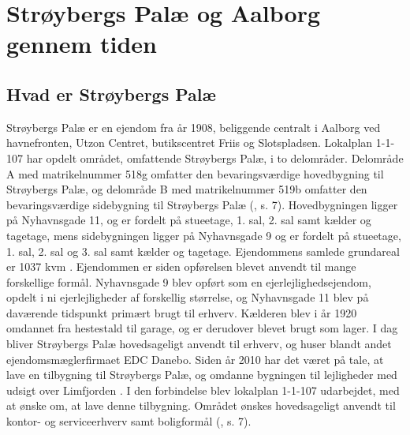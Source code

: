 \chapter{Strøybergs Palæ og Aalborg gennem tiden}

\section{Hvad er Strøybergs Palæ}
Strøybergs Palæ er en ejendom fra år 1908, beliggende centralt i Aalborg ved havnefronten, Utzon Centret, butikscentret Friis og Slotspladsen.
\newline \indent{     }  Lokalplan 1-1-107 har opdelt området, omfattende Strøybergs Palæ, i to delområder. Delområde A med matrikelnummer 518g omfatter den bevaringsværdige hovedbygning til Strøybergs Palæ, og delområde B med matrikelnummer 519b omfatter den bevaringsværdige sidebygning til Strøybergs Palæ (\citep{lokalplan}, s. 7). Hovedbygningen ligger på Nyhavnsgade 11, og er fordelt på stueetage, 1. sal, 2. sal samt kælder og tagetage, mens sidebygningen ligger på Nyhavnsgade 9 og er fordelt på stueetage, 1. sal, 2. sal og 3. sal samt kælder og tagetage. Ejendommens samlede grundareal er 1037 kvm \citep{byggesagen}.
\newline 
\newline 
Ejendommen er siden opførelsen blevet anvendt til mange forskellige formål. 
\newline \indent{     }  Nyhavnsgade 9 blev opført som en ejerlejlighedsejendom, opdelt i ni ejerlejligheder af forskellig størrelse, og Nyhavnsgade 11 blev på daværende tidspunkt primært brugt til erhverv. 
\newline \indent{     }  Kælderen blev i år 1920 omdannet fra hestestald til garage, og er derudover blevet brugt som lager.
\newline \indent{     }  I dag bliver Strøybergs Palæ hovedsageligt anvendt til erhverv, og huser blandt andet ejendomsmæglerfirmaet EDC Danebo.
\newline \indent{     }  Siden år 2010 har det været på tale, at lave en tilbygning til Strøybergs Palæ, og omdanne bygningen til lejligheder med udsigt over Limfjorden \citep{link}. I den forbindelse blev lokalplan 1-1-107 udarbejdet, med at ønske om, at lave denne tilbygning. Området ønskes hovedsageligt anvendt til kontor- og serviceerhverv samt boligformål (\citep{lokalplan}, s. 7).

